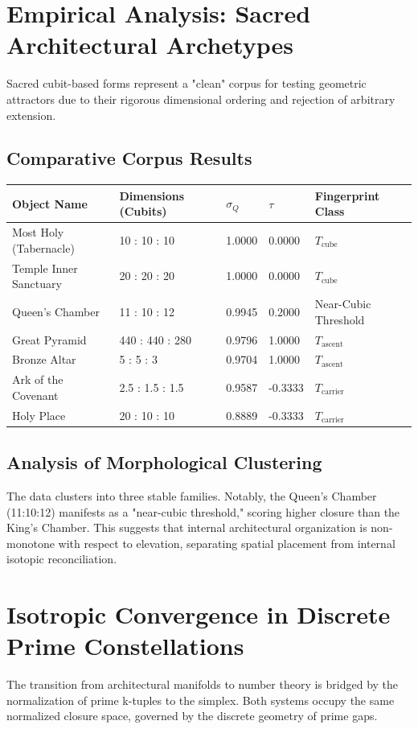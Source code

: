 \documentclass[12pt]{article}
\begin{document}
\section{Empirical Analysis: Sacred Architectural Archetypes}
Sacred cubit-based forms represent a "clean" corpus for testing geometric attractors due to their rigorous dimensional ordering and rejection of arbitrary extension.

\subsection{Comparative Corpus Results}
\begin{table}[h]
\centering
\begin{tabular}{lllll}
\toprule
Object Name & Dimensions (Cubits) & $\sigma_Q$ & $\tau$ & Fingerprint Class \\
\midrule
Most Holy (Tabernacle) & 10 : 10 : 10 & 1.0000 & 0.0000 & $T_{\mathrm{cube}}$ \\
Temple Inner Sanctuary & 20 : 20 : 20 & 1.0000 & 0.0000 & $T_{\mathrm{cube}}$ \\
Queen’s Chamber & 11 : 10 : 12 & 0.9945 & 0.2000 & Near-Cubic Threshold \\
Great Pyramid & 440 : 440 : 280 & 0.9796 & 1.0000 & $T_{\mathrm{ascent}}$ \\
Bronze Altar & 5 : 5 : 3 & 0.9704 & 1.0000 & $T_{\mathrm{ascent}}$ \\
Ark of the Covenant & 2.5 : 1.5 : 1.5 & 0.9587 & -0.3333 & $T_{\mathrm{carrier}}$ \\
Holy Place & 20 : 10 : 10 & 0.8889 & -0.3333 & $T_{\mathrm{carrier}}$ \\
\bottomrule
\end{tabular}
\end{table}

\subsection{Analysis of Morphological Clustering}
The data clusters into three stable families. Notably, the Queen’s Chamber (11:10:12) manifests as a "near-cubic threshold," scoring higher closure than the King's Chamber. This suggests that internal architectural organization is non-monotone with respect to elevation, separating spatial placement from internal isotopic reconciliation.

\section{Isotropic Convergence in Discrete Prime Constellations}
The transition from architectural manifolds to number theory is bridged by the normalization of prime k-tuples to the simplex. Both systems occupy the same normalized closure space, governed by the discrete geometry of prime gaps.
\end{document}

